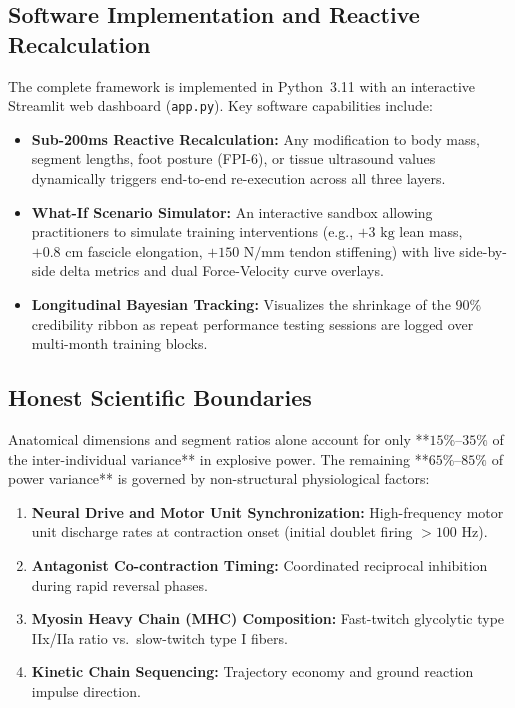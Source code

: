 \documentclass[11pt,a4paper]{article}
\begin{document}
\subsection{Software Implementation and Reactive Recalculation}
The complete framework is implemented in Python~3.11 with an interactive Streamlit web dashboard (\texttt{app.py}). Key software capabilities include:
\begin{itemize}
    \item \textbf{Sub-200ms Reactive Recalculation:} Any modification to body mass, segment lengths, foot posture (FPI-6), or tissue ultrasound values dynamically triggers end-to-end re-execution across all three layers.
    \item \textbf{What-If Scenario Simulator:} An interactive sandbox allowing practitioners to simulate training interventions (e.g., $+3\text{ kg}$ lean mass, $+0.8\text{ cm}$ fascicle elongation, $+150\text{ N/mm}$ tendon stiffening) with live side-by-side delta metrics and dual Force-Velocity curve overlays.
    \item \textbf{Longitudinal Bayesian Tracking:} Visualizes the shrinkage of the 90\% credibility ribbon as repeat performance testing sessions are logged over multi-month training blocks.
\end{itemize}

\subsection{Honest Scientific Boundaries}
Anatomical dimensions and segment ratios alone account for only **$15\%\text{--}35\%$ of the inter-individual variance** in explosive power. The remaining **$65\%\text{--}85\%$ of power variance** is governed by non-structural physiological factors:
\begin{enumerate}
    \item \textbf{Neural Drive and Motor Unit Synchronization:} High-frequency motor unit discharge rates at contraction onset (initial doublet firing $>100\text{ Hz}$).
    \item \textbf{Antagonist Co-contraction Timing:} Coordinated reciprocal inhibition during rapid reversal phases.
    \item \textbf{Myosin Heavy Chain (MHC) Composition:} Fast-twitch glycolytic type IIx/IIa ratio vs.\ slow-twitch type I fibers.
    \item \textbf{Kinetic Chain Sequencing:} Trajectory economy and ground reaction impulse direction.
\end{enumerate}
\end{document}
